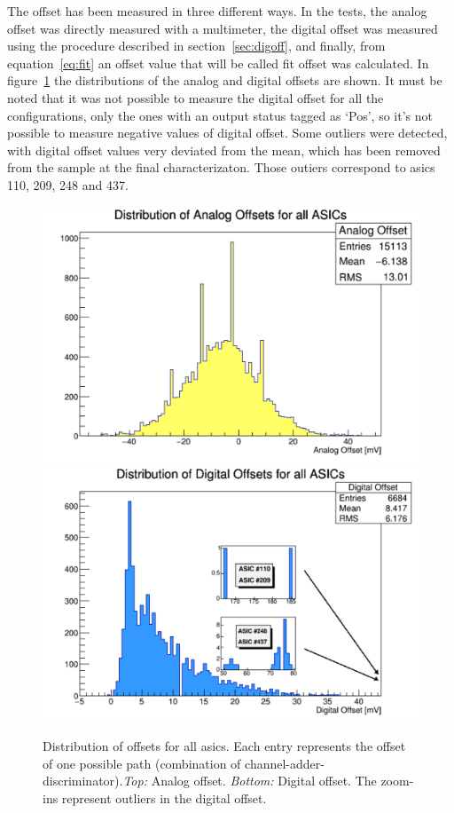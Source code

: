 \documentclass[main.tex]{subfiles}
\begin{document}
The offset has been measured in three different ways. In the tests, the analog offset was directly measured with a multimeter, the digital offset was measured using the procedure described in section~\ref{sec:digoff},
and finally, from equation~\ref{eq:fit} an offset value that will be called fit offset was calculated.
In figure~\ref{fig:offsetdist} the distributions of the analog and digital offsets are shown. It must be noted that it was not possible to measure the digital offset for all the configurations, only the ones with an output status tagged as `Pos', so it's not possible to measure negative values of digital offset. Some outliers were detected, with digital offset values very deviated from the mean, which has been removed from the sample at the final characterizaton. Those outiers correspond to \glspl{asic} 110, 209, 248 and 437.
\begin{figure}[h]
  \centering
  \includegraphics[width=\textwidth]{./Pictures/analogdist.pdf}\\
  \endminipage
  \includegraphics[width=\textwidth]{./Pictures/digitaldist.pdf}
  \endminipage
  \caption{Distribution of offsets for all \glspl{asic}. Each entry represents the offset of one possible path (combination of channel-adder-discriminator).\textit{Top:} Analog offset. \textit{Bottom:} Digital offset. The zoom-ins represent outliers in the digital offset.}
  \label{fig:offsetdist}
\end{figure}
\end{document}

